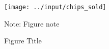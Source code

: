 \begin{figure}[H]
    \caption{Figure Title}
    
    \begin{centering}
    \texttt{[image: ../input/chips\_sold]}
    \par\end{centering}
    Note: Figure note
\end{figure}
